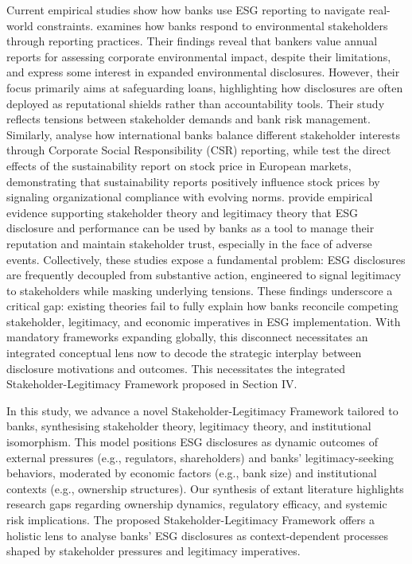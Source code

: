 \documentclass[
  authoryear]{elsarticle}
\begin{document}
Current empirical studies show how banks use ESG reporting to navigate
real-world constraints. \citet{THOMPSON2004} examines how banks respond
to environmental stakeholders through reporting practices. Their
findings reveal that bankers value annual reports for assessing
corporate environmental impact, despite their limitations, and express
some interest in expanded environmental disclosures. However, their
focus primarily aims at safeguarding loans, highlighting how disclosures
are often deployed as reputational shields rather than accountability
tools.\hspace{0pt}\hspace{0pt} Their study reflects tensions between
stakeholder demands and bank risk management. Similarly,
\citet{SCHOLTENS2009} analyse how international banks balance different
stakeholder interests through Corporate Social Responsibility (CSR)
reporting, while \citet{CARNEVALE2014} test the direct effects of the
sustainability report on stock price in European markets, demonstrating
that sustainability reports positively influence stock prices by
signaling organizational compliance with evolving norms.
\citet{MURE2021} provide empirical evidence supporting stakeholder
theory and legitimacy theory that ESG disclosure and performance can be
used by banks as a tool to manage their reputation and maintain
stakeholder trust, especially in the face of adverse events.
Collectively, these studies expose a fundamental problem: ESG
disclosures are frequently decoupled from substantive action, engineered
to signal legitimacy to stakeholders while masking underlying
tensions.\hspace{0pt}\hspace{0pt} These findings underscore a critical
gap: existing theories fail to fully explain how banks reconcile
competing stakeholder, legitimacy, and economic imperatives in ESG
implementation. With mandatory frameworks expanding globally, this
disconnect necessitates an integrated conceptual lens now to decode the
strategic interplay between disclosure motivations and
outcomes.\hspace{0pt}\hspace{0pt} This necessitates the integrated
Stakeholder-Legitimacy Framework proposed in Section IV.

In this study, we advance a novel Stakeholder-Legitimacy Framework
\citep{CAMPBELL2007, AGUINIS2012} tailored to banks, synthesising
stakeholder theory, legitimacy theory, and institutional isomorphism.
This model positions ESG disclosures as dynamic outcomes of external
pressures (e.g., regulators, shareholders) and banks' legitimacy-seeking
behaviors, moderated by economic factors (e.g., bank size) and
institutional contexts (e.g., ownership structures). Our synthesis of
extant literature highlights research gaps regarding ownership dynamics,
regulatory efficacy, and systemic risk implications. The proposed
Stakeholder-Legitimacy Framework offers a holistic lens to analyse
banks' ESG disclosures as context-dependent processes shaped by
stakeholder pressures and legitimacy imperatives.
\end{document}
